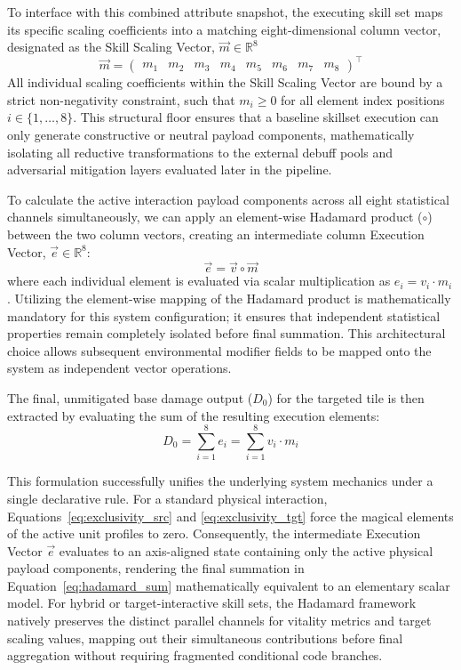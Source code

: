 \documentclass[twocolumn,10pt]{article}
\begin{document}
To interface with this combined attribute snapshot, the executing skill set maps its specific scaling coefficients into a matching eight-dimensional column vector, designated as the Skill Scaling Vector, $\vec{m} \in \mathbb{R}^8$
\begin{equation}
\vec{m} = \begin{pmatrix} m_1 & m_2 & m_3 & m_4 & m_5 & m_6 & m_7 & m_8 \end{pmatrix}^{\top}
\end{equation}
All individual scaling coefficients within the Skill Scaling Vector are bound by a strict non-negativity constraint, such that $m_i \ge 0$ for all element index positions $i \in \{1, \dots, 8\}$. This structural floor ensures that a baseline skillset execution can only generate constructive or neutral payload components, mathematically isolating all reductive transformations to the external debuff pools and adversarial mitigation layers evaluated later in the pipeline.

To calculate the active interaction payload components across all eight statistical channels simultaneously, we can apply an element-wise Hadamard product ($\circ$) between the two column vectors, creating an intermediate column Execution Vector, $\vec{e} \in \mathbb{R}^8$:
\begin{equation}
\vec{e} = \vec{v} \circ \vec{m}
\label{eq:hadamard_exec}
\end{equation}
where each individual element is evaluated via scalar multiplication as $e_i = v_i \cdot m_i$. Utilizing the element-wise mapping of the Hadamard product is mathematically mandatory for this system configuration; it ensures that independent statistical properties remain completely isolated before final summation. This architectural choice allows subsequent environmental modifier fields to be mapped onto the system as independent vector operations.

The final, unmitigated base damage output ($D_0$) for the targeted tile is then extracted by evaluating the sum of the resulting execution elements:
\begin{equation}
D_0 = \sum_{i=1}^{8} e_i = \sum_{i=1}^{8} v_i \cdot m_i
\label{eq:hadamard_sum}
\end{equation}

This formulation successfully unifies the underlying system mechanics under a single declarative rule. For a standard physical interaction, Equations~\ref{eq:exclusivity_src} and \ref{eq:exclusivity_tgt} force the magical elements of the active unit profiles to zero. Consequently, the intermediate Execution Vector $\vec{e}$ evaluates to an axis-aligned state containing only the active physical payload components, rendering the final summation in Equation~\ref{eq:hadamard_sum} mathematically equivalent to an elementary scalar model. For hybrid or target-interactive skill sets, the Hadamard framework natively preserves the distinct parallel channels for vitality metrics and target scaling values, mapping out their simultaneous contributions before final aggregation without requiring fragmented conditional code branches.
\end{document}
